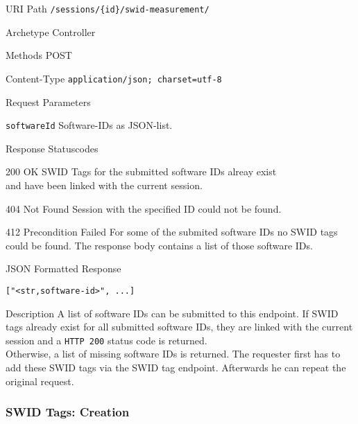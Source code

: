 \documentclass[10pt,a4paper]{scrartcl}
\begin{document}
\begin{mdframed}[style=def]
\begin{description*}
	\item[URI Path] \texttt{/sessions/\{id\}/swid-measurement/}
	\item[Archetype] Controller
	\item[Methods] POST
	\item[Content-Type] \texttt{application/json; charset=utf-8}
	\item[Request Parameters] \hfill
	\begin{description*}
		\item[\texttt{softwareId}] Software-IDs as JSON-list.
	\end{description*}
	\item[Response Statuscodes] \hfill
		\begin{description*}
			\item[200 OK] SWID Tags for the submitted software IDs alreay exist\\
				and have been linked with the current session.
			\item[404 Not Found] Session with the specified ID could not be found.
			\item[412 Precondition Failed] For some of the submited software IDs no
				SWID tags \\ could be found. The response body contains a list of those
				software IDs.
		\end{description*}
	\item[JSON Formatted Response] \hfill
\begin{lstlisting}
["<str,software-id>", ...]
\end{lstlisting}
	\item[Description] A list of software IDs can be submitted to this endpoint.
		If SWID tags already exist for all submitted software IDs, they are linked
		with the current session and a \texttt{HTTP 200} status code is returned.\\
		Otherwise, a list of missing software IDs is returned. The requester first
		has to add these SWID tags via the SWID tag endpoint. Afterwards he can
		repeat the original request.
\end{description*}
\end{mdframed}


\subsubsection{SWID Tags: Creation}
\end{document}
